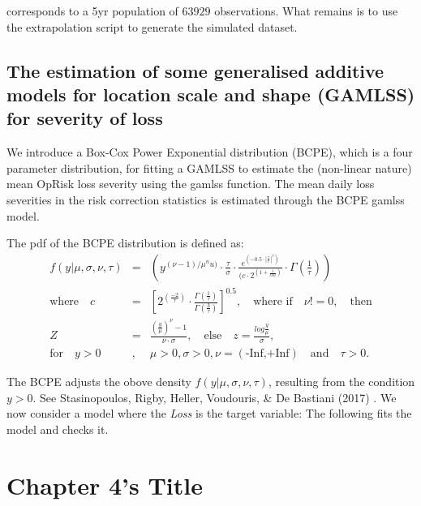 \documentclass{DissertateUSU}
\begin{document}
corresponds to a 5yr population of \(63929\) observations. What remains
is to use the extrapolation script to generate the simulated dataset.

\section{The estimation of some  generalised additive models for location scale and shape (GAMLSS) for severity of loss}
\label{sec:The estimation of some  generalised additive models for location scale and shape (GAMLSS) for severity of loss}

We introduce a Box-Cox Power Exponential distribution (BCPE), which is a
four parameter distribution, for fitting a GAMLSS to estimate the
(non-linear nature) mean OpRisk loss severity using the gamlss function.
The mean daily loss severities in the risk correction statistics is
estimated through the BCPE gamlss model.\medskip

The pdf of the BCPE distribution is defined as: \singlespacing
\begin{eqnarray}
f(y|\mu,\sigma,\nu,\tau)&=&(y^{(\nu-1)/\mu^nu)}\cdot{\frac{\tau}{\sigma}}\cdot \frac{e^(-0.5\cdot|\frac{z}{c}|^\tau)}{(c\cdot 2^(1+\frac{1}{tau})}\cdot \Gamma(\frac{1}{\tau}))\nonumber\\
\mbox{where} \quad c&=&[2^(\frac{-2}{\tau})\cdot\frac{\Gamma(\frac{1}{\tau})}{\Gamma(\frac{3}{\tau})}]^{0.5},\quad \mbox{where if}\quad \nu!=0, \quad \mbox{then} \nonumber\\
Z&=&\frac{(\frac{y}{\mu})^\nu-1}{\nu\cdot \sigma},\quad \mbox{else} \quad z=\frac{log\frac{y}{\mu}}{\sigma},\nonumber\\
\mbox{for} \quad y>0 &,& \mu>0, \sigma>0, \nu=(\mbox{-Inf,+Inf})\quad \mbox{and}\quad \tau>0.
\end{eqnarray} \doublespacing

The BCPE adjusts the obove density \(f(y|\mu,\sigma,\nu,\tau)\),
resulting from the condition \(y>0\). See Stasinopoulos, Rigby, Heller,
Voudouris, \& De Bastiani (2017) . We now consider a model where the
\emph{Loss} is the target variable: The following fits the model and
checks it.\medskip

\singlespacing

\FloatBarrier
\newpage
{}
\fancyhead[R]{\thepage}
\fancyfoot[C]{}

\chapter{Chapter 4's Title}
\end{document}
